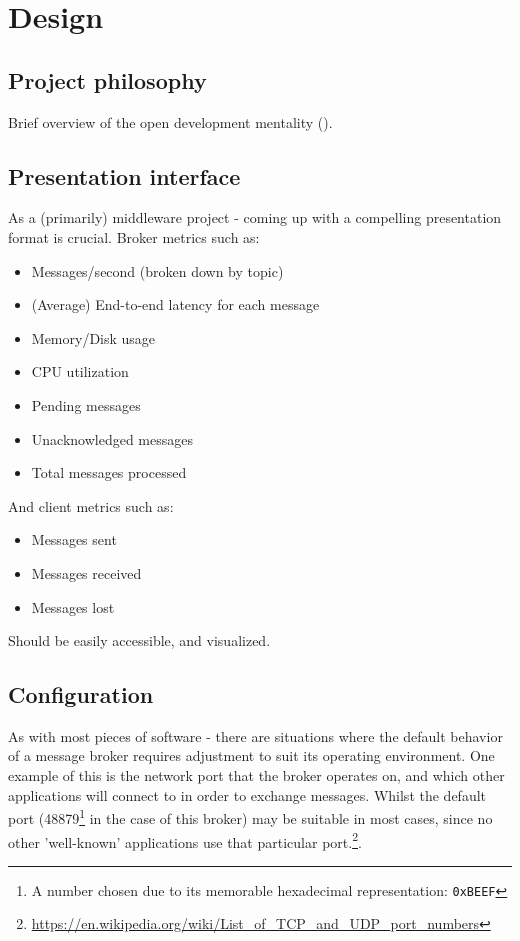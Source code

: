 \chapter{Design}
\label{chap:Design}

\section{Project philosophy}
\label{sec:Project philosophy}

Brief overview of the open development mentality ().

\section{Presentation interface}
\label{sec:presentation}

As a (primarily) middleware project - coming up with a compelling presentation
format is crucial. Broker metrics such as:

\begin{itemize}
  \item Messages/second (broken down by topic)
  \item (Average) End-to-end latency for each message
  \item Memory/Disk usage
  \item CPU utilization
  \item Pending messages
  \item Unacknowledged messages
  \item Total messages processed
\end{itemize}

And client metrics such as:

\begin{itemize}
  \item Messages sent
  \item Messages received
  \item Messages lost
\end{itemize}

Should be easily accessible, and visualized.

\section{Configuration}
\label{sec:Configuration}

As with most pieces of software - there are situations where the default
behavior of a message broker requires adjustment to suit its operating
environment. One example of this is the network port that the broker operates
on, and which other applications will connect to in order to exchange messages.
Whilst the default port (48879\footnote{A number chosen due to its memorable
hexadecimal representation: \texttt{0xBEEF}} in the case of this broker) may be
suitable in most cases, since no other 'well-known' applications use that
particular
port.\footnote{\url{https://en.wikipedia.org/wiki/List_of_TCP_and_UDP_port_numbers}}.

